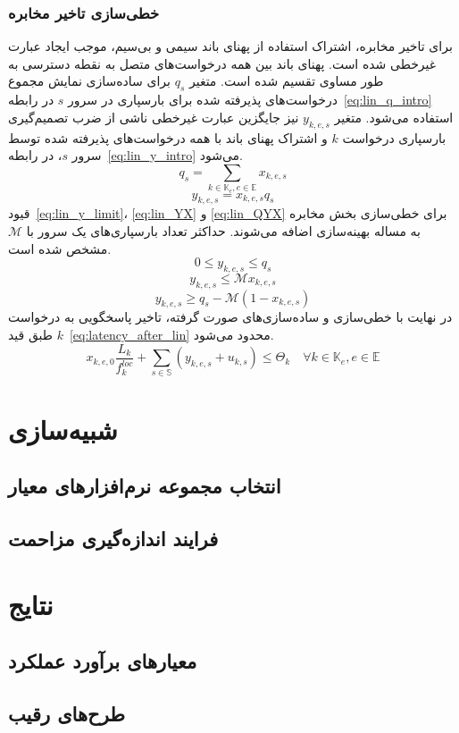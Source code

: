 \subsubsection{خطی‌سازی تاخیر مخابره}
برای تاخیر مخابره، اشتراک استفاده از پهنای باند سیمی و بی‌سیم، موجب ایجاد عبارت غیرخطی شده است. پهنای باند بین همه درخواست‌های متصل به نقطه دسترسی به طور مساوی تقسیم شده است. متغیر $q_s$ برای ساده‌سازی نمایش مجموع درخواست‌های پذیرفته شده برای بارسپاری در سرور $s$ در رابطه~\eqref{eq:lin_q_intro} استفاده می‌شود. متغیر $y_{k,e,s}$ نیز جایگزین عبارت غیرخطی ناشی از ضرب تصمیم‌گیری بارسپاری درخواست $k$ و اشتراک پهنای باند با همه درخواست‌های پذیرفته شده توسط سرور $s$، در رابطه~\eqref{eq:lin_y_intro} می‌شود.
\begin{equation} \label{eq:lin_q_intro}
    q_s = \sum_{k \in \mathbb{K}_e, e \in \mathbb{E}} x_{k,e,s}
\end{equation}
\begin{equation} \label{eq:lin_y_intro}
    y_{k,e,s} = x_{k,e,s} q_s
\end{equation}
قیود~\eqref{eq:lin_y_limit}، \eqref{eq:lin_YX} و \eqref{eq:lin_QYX} برای خطی‌سازی بخش مخابره به مساله بهینه‌سازی اضافه می‌شوند. حداکثر تعداد بارسپاری‌های یک سرور با $\mathcal{M}$ مشخص شده است.
\begin{equation} \label{eq:lin_y_limit}
    0 \leq y_{k,e,s} \leq q_s
\end{equation}
\begin{equation} \label{eq:lin_YX}
    y_{k,e,s} \leq \mathcal{M} x_{k,e,s}
\end{equation}
\begin{equation} \label{eq:lin_QYX}
    y_{k,e,s} \geq q_s - \mathcal{M} (1-x_{k,e,s})
\end{equation}
در نهایت با خطی‌سازی و ساده‌سازی‌های صورت گرفته، تاخیر پاسخگویی به درخواست $k$ طبق قید~\eqref{eq:latency_after_lin} محدود می‌شود.
\begin{equation} \label{eq:latency_after_lin}
    x_{k,e,0}\frac{L_k}{f^{loc}_k} + \sum_{s \in \mathbb{S}} \left(y_{k,e,s} + u_{k,s}\right) \leq \Theta_k \quad \forall k \in \mathbb{K}_e, e \in \mathbb{E}
\end{equation}

\section{شبیه‌سازی}

\subsection{انتخاب مجموعه نرم‌افزارهای معیار}

\subsection{فرایند اندازه‌گیری مزاحمت}

\section{نتایج}

\subsection{معیارهای برآورد عملکرد}

\subsection{طرح‌های رقیب}